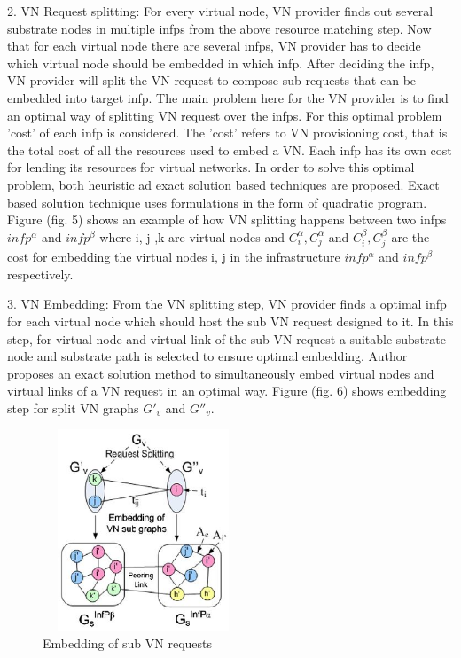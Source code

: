 \documentclass[article,dr=phil,type=msc ,colorback,accentcolor=tud4b]{tudthesis}
\begin{document}
2. VN Request splitting: For every virtual node, VN provider finds out several substrate nodes in multiple infps from the above resource matching step. Now that for each virtual node there are several infps, VN provider has to decide which virtual node should be embedded in which infp. After deciding the infp, VN provider will split the VN request to compose sub-requests that can be embedded into target infp. The main problem here for the VN provider is to find an optimal way of splitting VN request over the infps. For this optimal problem 'cost' of each infp is considered. The 'cost' refers to VN provisioning cost, that is the total cost of all the resources used to embed a VN. Each infp has its own cost for lending its resources for virtual networks. In order to solve this optimal problem, both heuristic ad exact solution based techniques are proposed. Exact based solution technique uses formulations in the form of quadratic program. Figure (fig. 5) shows an example of how VN splitting happens between two infps $infp^{\alpha}$ and $infp^{\beta}$ where i, j ,k are virtual nodes and $C_{i}^{\alpha}, C_{j}^{\alpha}$ and $C_{i}^{\beta}, C_{j}^{\beta}$ are the cost for embedding the virtual nodes i, j in the infrastructure $infp^{\alpha}$ and $infp^{\beta}$ respectively.\newline

3. VN Embedding: From the VN splitting step, VN provider finds a optimal infp for each virtual node which should host the sub VN request designed to it. In this step, for virtual node and virtual link of the sub VN request a suitable substrate node and substrate path is selected to ensure optimal embedding. Author proposes an exact solution method to simultaneously embed virtual nodes and virtual links of a VN request in an optimal way. Figure (fig. 6) shows embedding step for split VN graphs $G'_{v}$ and $G''_{v}$.

\begin{figure}[h]
	\centering
	\includegraphics[width=6cm, height=6cm]{vn_embedding.jpg}
	\caption{Embedding of sub VN requests}
	\label{fig: VN embedding}
\end{figure}
\end{document}
